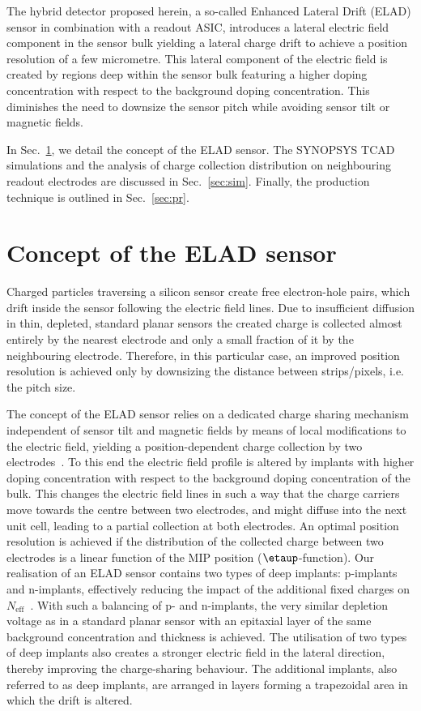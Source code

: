 \documentclass[a4paper,11pt]{article}
\begin{document}
The hybrid detector proposed herein, a so-called Enhanced Lateral Drift (ELAD) sensor in combination with a readout ASIC,
 introduces a lateral electric field component in the sensor bulk yielding a lateral charge drift to achieve a position resolution of a few micrometre. 
This lateral component of the electric field is created by regions deep within the sensor bulk featuring a higher doping concentration with respect to the background doping concentration.
This diminishes the need to downsize the sensor pitch while avoiding sensor tilt or magnetic fields. 

In Sec.~\ref{sec:con}, we detail the concept of the ELAD sensor.
The SYNOPSYS TCAD simulations and the analysis of charge collection distribution on neighbouring readout electrodes are discussed in Sec.~\ref{sec:sim}.
Finally, the production technique is outlined in Sec.~\ref{sec:pr}. 


\section{Concept of the ELAD sensor}
\label{sec:con}
Charged particles traversing a silicon sensor create free electron-hole pairs, which drift inside the sensor following the electric field lines.
Due to insufficient diffusion in thin, depleted, standard planar sensors the created charge is collected almost entirely by the nearest electrode and only a small fraction of it by the neighbouring electrode.
Therefore, in this particular case, an improved position resolution is achieved only by downsizing the distance between strips/pixels, i.e. the pitch size.

The concept of the ELAD sensor relies on a dedicated charge sharing mechanism independent of sensor tilt and magnetic fields by means of local modifications to the electric field,
 yielding a position-dependent charge collection by two electrodes~\cite{hj}.
To this end the electric field profile is altered by implants with higher doping concentration with respect to the background doping concentration of the bulk. 
This changes the electric field lines in such a way that the charge carriers move towards the centre between two electrodes, and might diffuse into the next unit cell, leading to a partial collection at both electrodes.
An optimal position resolution is achieved if the distribution of the collected charge between two electrodes is a linear function of the MIP position ($\etaup$-function).
Our realisation of an ELAD sensor contains two types of deep implants: p-implants and n-implants, effectively reducing the impact of the additional fixed charges on $N\mathrm{_{eff}}$~\cite{elad}. 
With such a balancing of p- and n-implants, the very similar depletion voltage as in a standard planar sensor with an epitaxial layer of the same background concentration and thickness is achieved.
The utilisation of two types of deep implants also creates a stronger electric field in the lateral direction, thereby improving the charge-sharing behaviour.
The additional implants, also referred to as deep implants, are arranged in layers forming a trapezoidal area in which the drift is altered. 
\end{document}
